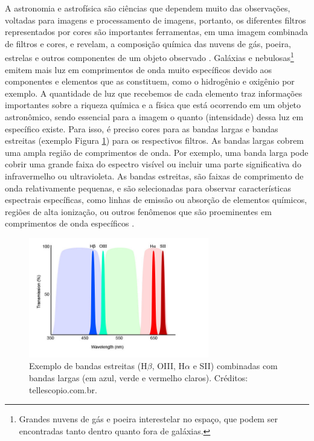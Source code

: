 A astronomia e astrofísica são ciências que dependem muito das observações, voltadas para imagens e processamento de imagens, portanto, os diferentes filtros representados por cores são importantes ferramentas, em uma imagem combinada de filtros e cores, e revelam, a composição química das nuvens de gás, poeira, estrelas e outros componentes de um objeto observado \cite{2007soaress}. Galáxias e nebulosas\footnote{Grandes nuvens de gás e poeira interestelar no espaço, que podem ser encontradas tanto dentro quanto fora de galáxias.} emitem mais luz em comprimentos de onda muito específicos devido aos componentes e elementos que as constituem, como o hidrogênio e oxigênio por exemplo. A quantidade de luz que recebemos de cada elemento traz informações importantes sobre a riqueza química e a física que está ocorrendo em um objeto astronômico, sendo essencial para a imagem o quanto (intensidade) dessa luz em específico existe. Para isso, é preciso cores para as bandas largas e bandas estreitas (exemplo Figura \ref{fig:narrowbandandbroadband}) para os respectivos filtros. As bandas largas cobrem uma ampla região de comprimentos de onda. Por exemplo, uma banda larga pode cobrir uma grande faixa do espectro visível ou incluir uma parte significativa do infravermelho ou ultravioleta. As bandas estreitas, são faixas de comprimento de onda relativamente pequenas, e são selecionadas para observar características espectrais específicas, como linhas de emissão ou absorção de elementos químicos, regiões de alta ionização, ou outros fenômenos que são proeminentes em comprimentos de onda específicos \cite{2023Kepler}.
 
  \begin{figure}[h]
    \centering 
    \includegraphics[width=0.7\textwidth]{Imagens/narrowbandandbroadband.jpg} 
    \caption[Exemplo de bandas estreitas combinadas com bandas largas.]{Exemplo de bandas estreitas (H$\beta$, OIII, H$\alpha$ e SII) combinadas com bandas largas (em azul, verde e vermelho claros). Créditos: tellescopio.com.br.}
    \label{fig:narrowbandandbroadband} 
  \end{figure}

